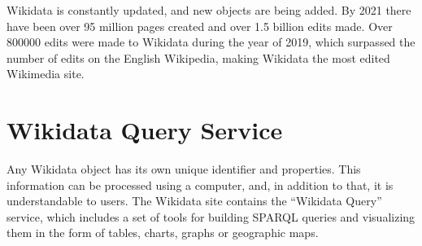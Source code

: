 Wikidata is constantly updated, and new objects are being added. By 2021 there have been over 95 million pages created and over 1.5 billion edits made. Over \num{800000} edits were made to Wikidata during the year of 2019, which surpassed the number of edits on the English Wikipedia, making Wikidata the most edited Wikimedia site.
\begin{marginfigure}[1cm]
{
	\setlength{\fboxsep}{0pt}%
	\setlength{\fboxrule}{1pt}%
}
    \caption[Wikidata logo.]{Wikidata logo.\newline
Wikimedia Commons / \href{https://commons.wikimedia.org/wiki/File:Wikidata-logo-en.svg}{Planemad}.%
}
\label{fig:wikidata_logo}
\end{marginfigure}

\section{Wikidata Query Service}
Any Wikidata object has its own unique identifier and properties. This information can be processed using a computer, and, in addition to that, it is understandable to users. 
\newpage
The Wikidata site contains the ``Wikidata Query'' service, which includes a set of tools for building SPARQL queries and visualizing them in the form of tables, charts, graphs or geographic maps.

